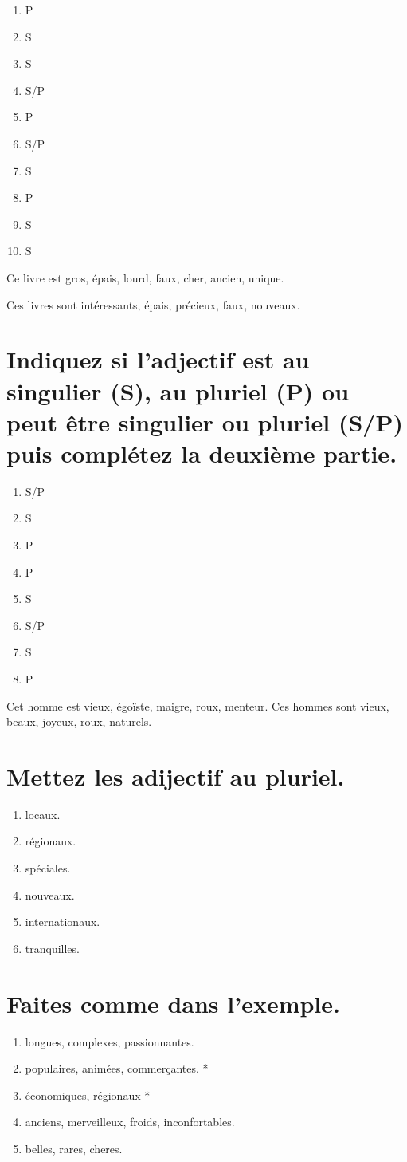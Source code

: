 \begin{enumerate}
    \item P
    \item S
    \item S
    \item S/P
    \item P
    \item S/P
    \item S
    \item P
    \item S
    \item S
\end{enumerate}

Ce livre est gros, épais, lourd, faux, cher, ancien, unique.

Ces livres sont intéressants, épais, précieux, faux, nouveaux.

\section{Indiquez si l'adjectif est au singulier (S), au pluriel (P) ou peut être singulier ou pluriel (S/P) puis complétez la deuxième partie.}

\begin{enumerate}
    \item S/P
    \item S
    \item P
    \item P
    \item S
    \item S/P
    \item S
    \item P
\end{enumerate}

Cet homme est vieux, égoïste, maigre, roux, menteur.
Ces hommes sont vieux, beaux, joyeux, roux, naturels.

\section{Mettez les adijectif au pluriel.}

\begin{enumerate}
    \item locaux.
    \item régionaux.
    \item spéciales.
    \item nouveaux.
    \item internationaux.
    \item tranquilles.
\end{enumerate}

\section{Faites comme dans l'exemple.}

\begin{enumerate}
    \item longues, complexes, passionnantes.
    \item populaires, animées, commerçantes. *
    \item économiques, régionaux *
    \item anciens, merveilleux, froids, inconfortables.
    \item belles, rares, cheres.
\end{enumerate}